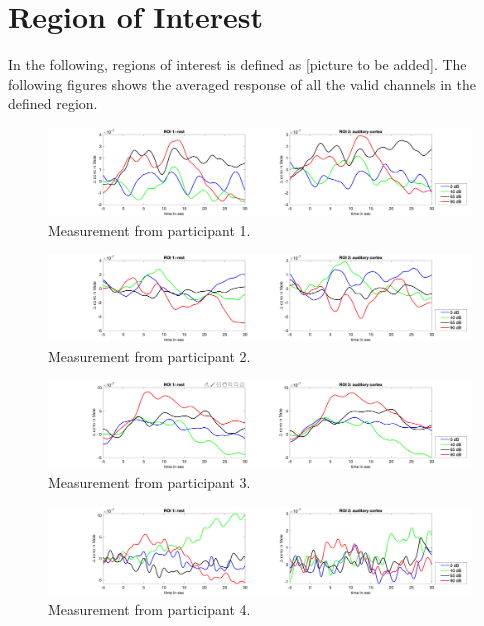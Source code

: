 \section {Region of Interest}
In the following, regions of interest is defined as [picture to be added]. The following figures shows the averaged response of all the valid channels in the defined region.
\begin{figure}[H]
  \centering
    \includegraphics[scale=.29]{bilder/ROI/sub_chang_s_HbO.png}
  \caption{Measurement from participant  1.}
  \label{fig:somesignal}
\end{figure}

\begin{figure}[H]
  \centering
    \includegraphics[scale=.29]{bilder/ROI/sub_gleb2_s_HbO.png}
  \caption{Measurement from participant  2.}
  \label{fig:somesignal}
\end{figure}

\begin{figure}[H]
  \centering
    \includegraphics[scale=.29]{bilder/ROI/sub_jonas_s_HbO.png}
  \caption{Measurement from participant  3.}
  \label{fig:somesignal}
\end{figure}

\begin{figure}[H]
  \centering
    \includegraphics[scale=.29]{bilder/ROI/sub_lin_s_HbO.png}
  \caption{Measurement from participant  4.}
  \label{fig:somesignal}
\end{figure}

